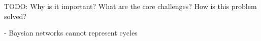 TODO:  Why is it important? What are the core challenges? How is this problem solved?

- Baysian networks cannot represent cycles
